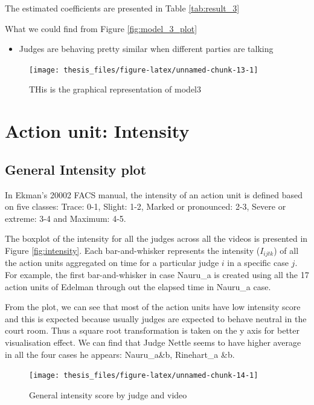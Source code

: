 \documentclass{monashthesis}
\begin{document}
The estimated coefficients are presented in Table \ref{tab:result_3}

What we could find from Figure \ref{fig:model_3_plot}

\begin{itemize}
\tightlist
\item
  Judges are behaving pretty similar when different parties are talking
\end{itemize}

\begin{figure}
\texttt{[image: thesis\_files/figure-latex/unnamed-chunk-13-1]} \caption{THis is the graphical representation of model3\label{fig:model_3_plot}}\label{fig:unnamed-chunk-13}
\end{figure}

\hypertarget{action-unit-intensity}{%
\section{Action unit: Intensity}\label{action-unit-intensity}}

\hypertarget{general-intensity-plot}{%
\subsection{General Intensity plot}\label{general-intensity-plot}}

In Ekman's 20002 FACS manual, the intensity of an action unit is defined based on five classes: Trace: 0-1, Slight: 1-2, Marked or pronounced: 2-3, Severe or extreme: 3-4 and Maximum: 4-5.

The boxplot of the intensity for all the judges across all the videos is presented in Figure \ref{fig:intensity}. Each bar-and-whisker represents the intensity (\(I_{ijtk}\)) of all the action units aggregated on time for a particular judge \(i\) in a specific case \(j\). For example, the first bar-and-whisker in case Nauru\_a is created using all the 17 action units of Edelman through out the elapsed time in Nauru\_a case.

From the plot, we can see that most of the action units have low intensity score and this is expected because usually judges are expected to behave neutral in the court room. Thus a square root transformation is taken on the y axis for better visualisation effect. We can find that Judge Nettle seems to have higher average in all the four cases he appears: Nauru\_a\&b, Rinehart\_a \&b.

\begin{figure}
\texttt{[image: thesis\_files/figure-latex/unnamed-chunk-14-1]} \caption{General intensity score by judge and video\label{fig:intensity}}\label{fig:unnamed-chunk-14}
\end{figure}
\end{document}
